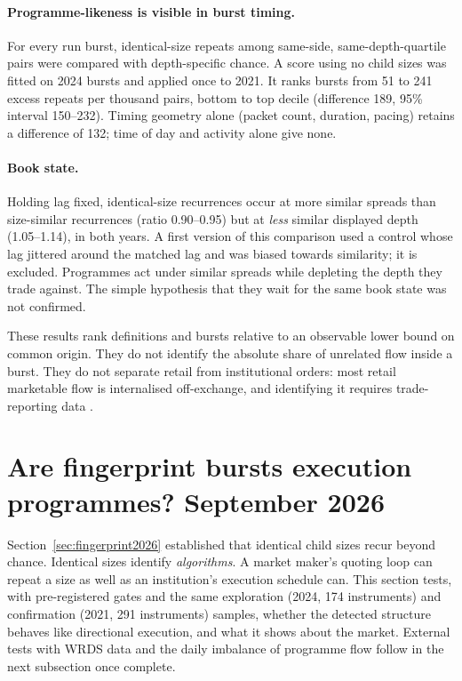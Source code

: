 \documentclass[11pt]{article}
\begin{document}
\paragraph{Programme-likeness is visible in burst timing.} For every run burst, identical-size
repeats among same-side, same-depth-quartile pairs were compared with depth-specific chance. A
score using no child sizes was fitted on 2024 bursts and applied once to 2021. It ranks bursts
from 51 to 241 excess repeats per thousand pairs, bottom to top decile (difference 189,
95\% interval 150--232). Timing geometry alone (packet count, duration, pacing) retains a
difference of 132; time of day and activity alone give none.

\paragraph{Book state.} Holding lag fixed, identical-size recurrences occur at more similar
spreads than size-similar recurrences (ratio 0.90--0.95) but at \emph{less} similar displayed
depth (1.05--1.14), in both years. A first version of this comparison used a control whose lag
jittered around the matched lag and was biased towards similarity; it is excluded. Programmes
act under similar spreads while depleting the depth they trade against. The simple hypothesis
that they wait for the same book state was not confirmed.

These results rank definitions and bursts relative to an observable lower bound on common origin.
They do not identify the absolute share of unrelated flow inside a burst. They do not separate
retail from institutional orders: most retail marketable flow is internalised off-exchange, and
identifying it requires trade-reporting data \citep{boehmer2021}.

\section{Are fingerprint bursts execution programmes? September 2026}
\label{sec:programevidence2026}

Section~\ref{sec:fingerprint2026} established that identical child sizes recur beyond chance.
Identical sizes identify \emph{algorithms}. A market maker's quoting loop can repeat a size as
well as an institution's execution schedule can. This section tests, with pre-registered gates and
the same exploration (2024, 174 instruments) and confirmation (2021, 291 instruments) samples,
whether the detected structure behaves like directional execution, and what it shows about the
market. External tests with WRDS data and the daily imbalance of programme flow follow in the
next subsection once complete.
\end{document}
